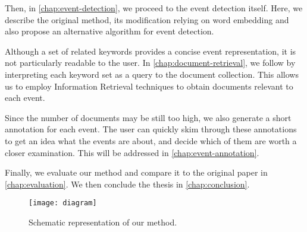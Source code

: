 Then, in \autoref{chap:event-detection}, we proceed to the event detection itself. Here, we describe the original method, its modification relying on word embedding and also propose an alternative algorithm for event detection.

Although a set of related keywords provides a concise event representation, it is not particularly readable to the user. In \autoref{chap:document-retrieval}, we follow by interpreting each keyword set as a query to the document collection. This allows us to employ Information Retrieval techniques to obtain documents relevant to each event.

Since the number of documents may be still too high, we also generate a short annotation for each event. The user can quickly skim through these annotations to get an idea what the events are about, and decide which of them are worth a closer examination. This will be addressed in \autoref{chap:event-annotation}.

Finally, we evaluate our method and compare it to the original paper in \autoref{chap:evaluation}. We then conclude the thesis in \autoref{chap:conclusion}.

\begin{figure}[H]
  \centering
  \texttt{[image: diagram]}
  \caption{Schematic representation of our method.}
  \label{fig:diagram}
\end{figure}
